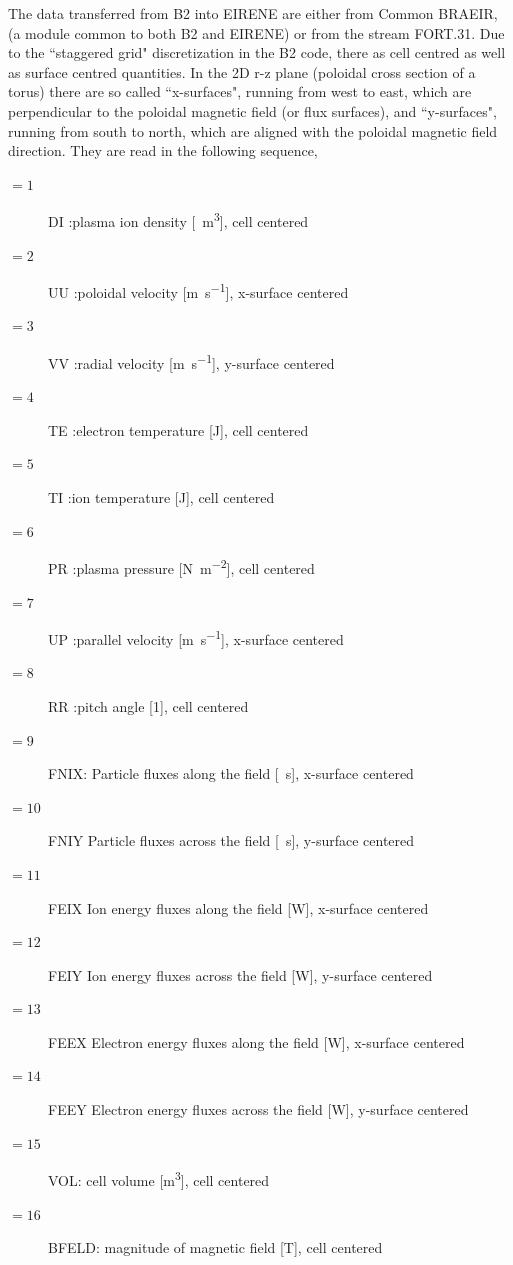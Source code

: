 The data transferred from B2 into EIRENE are either from Common BRAEIR, (a
module common to both B2 and EIRENE) or from the stream FORT.31.
Due to the ``staggered grid" discretization in the B2 code, there as cell
centred as well as surface centred quantities.
In the 2D r-z plane (poloidal cross section of a torus) there are so called
``x-surfaces", running from west to east, which are perpendicular to the
poloidal magnetic field (or flux surfaces), and ``y-surfaces", running from
south to north,  which are aligned with the poloidal magnetic field direction.
They are read in the following sequence,
\begin{description}
  \item[$= 1$] DI
        :plasma ion density [\si{\per\cubic\metre}], cell centered
  \item[$= 2$] UU
        :poloidal velocity [\si{\metre\per\second}], x-surface centered
  \item[$= 3$] VV
        :radial velocity [\si{\metre\per\second}], y-surface centered
  \item[$= 4$] TE
        :electron temperature [\si{\joule}], cell centered
  \item[$= 5$] TI :ion
        temperature [\si{\joule}], cell centered
  \item[$= 6$] PR :plasma pressure
          [\si{\newton\per\square\metre}], cell centered
  \item[$= 7$] UP :parallel
        velocity [\si{\metre\per\second}], x-surface centered
  \item[$= 8$] RR :pitch
        angle [\num{1}], cell centered
  \item[$= 9$] FNIX: Particle fluxes along the
        field [\si{\per\second}], x-surface centered
  \item[$= 10$] FNIY Particle fluxes
        across the field [\si{\per\second}], y-surface centered
  \item[$= 11$] FEIX Ion
        energy fluxes along the field [\si{\watt}], x-surface centered
  \item[$= 12$]
        FEIY Ion energy fluxes across the field [\si{\watt}], y-surface centered
  \item[$= 13$] FEEX Electron energy fluxes along the field [\si{\watt}],
        x-surface centered
  \item[$= 14$] FEEY Electron energy fluxes across the field
          [\si{\watt}], y-surface centered
  \item[$= 15$] VOL: cell volume
          [\si{\cubic\metre}], cell centered
  \item[$= 16$] BFELD: magnitude of magnetic
        field [\si{\tesla}], cell centered
\end{description}

